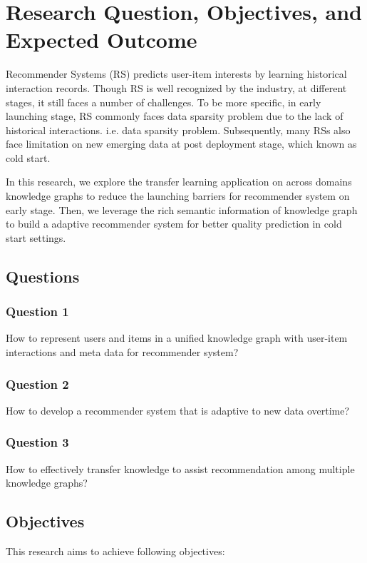 
\section{Research Question, Objectives, and Expected Outcome}

Recommender Systems (RS) predicts user-item interests by learning historical interaction records. Though RS is well recognized by the industry, at different stages, it still faces a number of challenges. 
To be more specific, in early launching stage, RS commonly faces data sparsity problem due to the lack of historical interactions. i.e. data sparsity problem. 
Subsequently, many RSs also face limitation on new emerging data at post deployment stage, which known as cold start. 

In this research, we explore the transfer learning application on across domains knowledge graphs to reduce the launching barriers for recommender system on early stage. Then, we leverage the rich semantic information of knowledge graph to build a adaptive recommender system for better quality prediction in cold start settings. 

\subsection{Questions}

\subsubsection*{Question 1}
How to represent users and items in a unified knowledge graph with user-item interactions and meta data for recommender system?

\subsubsection*{Question 2}
How to develop a recommender system that is adaptive to new data overtime?

\subsubsection*{Question 3}
How to effectively transfer knowledge to assist recommendation among multiple knowledge graphs?

\subsection{Objectives}
This research aims to achieve following objectives: 

